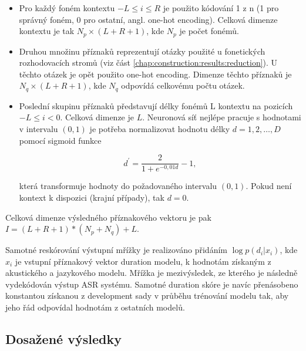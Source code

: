 \begin{itemize}
  \item Pro každý foném kontextu $-L \leq i \leq R$ je použito kódování 1 z n (1 pro správný foném, 0 pro ostatní, angl. one-hot encoding). Celková dimenze kontextu je tak $N_{p} \times \left(L + R + 1\right)$, kde $N_{p}$ je počet fonémů.
  \item Druhou množinu příznaků reprezentují otázky použité u fonetických rozhodovacích stromů (viz část \ref{chap:construction:results:reduction}). U těchto otázek je opět použito one-hot encoding. Dimenze těchto příznaků je $N_{q} \times \left(L + R + 1\right)$, kde $N_{q}$ odpovídá celkovému počtu otázek.
  \item Poslední skupinu příznaků představují délky fonémů L kontextu na pozicích $-L \leq i < 0$. Celková dimenze je $L$. Neuronová síť nejlépe pracuje s hodnotami v intervalu $\left(0, 1\right)$ je potřeba normalizovat hodnotu délky $d=1, 2, \dots, D$ pomocí sigmoid funkce

  \begin{equation}
    d^{\prime} = \frac{2}{1 + e^{-0,01d}} - 1,
    \label{eq:realisation:durationmodels:nn:normalization}
  \end{equation}

  \noindent která transformuje hodnoty do požadovaného intervalu $\left(0, 1\right)$. Pokud není kontext k dispozici (krajní případy), tak $d = 0$.
\end{itemize}

\noindent Celková dimenze výsledného příznakového vektoru je pak $I = \left(L + R + 1\right) \ast \left(N_{p} + N_{q}\right) + L$.

Samotné reskórování výstupní mřížky je realizováno přidáním $\log p\left(d_{i}| x_{i}\right)$, kde $x_{i}$ je vstupní příznakový vektor duration modelu, k hodnotám získaným z akustického a jazykového modelu. Mřížka je mezivýsledek, ze kterého je následně vydekódován výstup ASR systému. Samotné duration skóre je navíc přenásobeno konstantou získanou z development sady v průběhu trénování modelu tak, aby jeho řád odpovídal hodnotám z ostatních modelů. \cite{Hadian2017}

\subsection{Dosažené výsledky}
\label{chap:realisation:durationmodels:nn:softmax}

